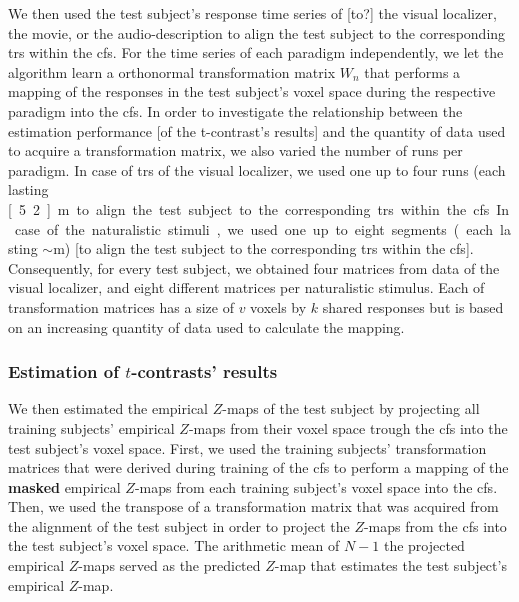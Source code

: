 %
We then used the test subject's response time series of [to?] the visual
localizer, the movie, or the audio-description to align the test subject to the
corresponding \acp{tr} within the \ac{cfs}.
%
For the time series of each paradigm independently, we let the algorithm learn a
orthonormal transformation matrix $W_{n}$ that performs a mapping of the
responses in the test subject's voxel space during the respective paradigm into
the \ac{cfs}.
%
In order to investigate the relationship between the estimation performance [of
the t-contrast's results] and the quantity of data used to acquire a
transformation matrix, we also varied the number of runs per paradigm.
%
In case of \acp{tr} of the visual localizer, we used one up to four runs (each
lasting \unit[5.2]{m} to align the test subject to the corresponding \acp{tr}
within the \ac{cfs}.
%
In case of the naturalistic stimuli, we used one up to eight segments (each
lasting $\sim$\unit[15]{m}) [to align the test subject to the corresponding
\acp{tr} within the \ac{cfs}].
%
Consequently, for every test subject, we obtained four matrices from data of the
visual localizer, and eight different matrices per naturalistic stimulus.
%
Each of transformation matrices has a size of $v$ voxels by $k$ shared responses
but is based on an increasing quantity of data used to calculate the mapping.


\subsubsection{Estimation of $t$-contrasts' results}



We then estimated the empirical $Z$-maps of the test subject by projecting all
training subjects' empirical $Z$-maps from their voxel space trough the \ac{cfs}
into the test subject's voxel space.
First, we used the training subjects' transformation matrices that were derived
during training of the \ac{cfs} to perform a mapping of the \textbf{masked}
empirical $Z$-maps from each training subject's voxel space into the \ac{cfs}.
Then, we used the transpose of a transformation matrix that was acquired from
the alignment of the test subject in order to project the $Z$-maps from the
\ac{cfs} into the test subject's voxel space.
The arithmetic mean of $N-1$ the projected empirical $Z$-maps served as the
predicted $Z$-map that estimates the test subject's empirical $Z$-map.



